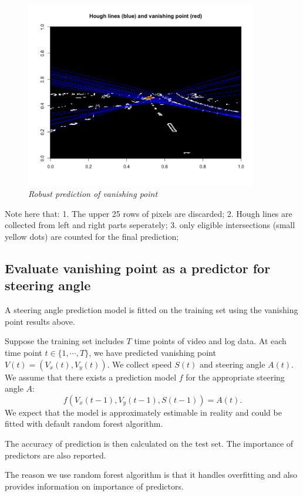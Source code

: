 \documentclass[11pt, oneside]{article}
\begin{document}
\begin{figure}[!ht]
  \centering
      \includegraphics[width=0.9\textwidth]{Rplot2.png} 
  \caption{\textit{Robust prediction of vanishing point}}
\end{figure}

Note here that: 1. The upper 25 rows of pixels are discarded; 2. Hough lines are collected from left and right parts seperately; 3. only eligible intersections (small yellow dots) are counted for the final prediction;


\subsection*{Evaluate vanishing point as a predictor for steering angle}

A steering angle prediction model is fitted on the training set using the vanishing point results above. 

Suppose the training set includes $T$ time points of video and log data. At each time point $t \in \{1, \cdots, T\}$, we have predicted vanishing point $V(t) = (V_x(t), V_y(t))$. We collect speed $S(t)$ and steering angle $A(t)$. We assume that there exists a prediction model $f$ for the appropriate steering angle $A$:
$$
f(V_x(t-1), V_y(t-1), S(t-1)) = A(t).
$$
We expect that the model is approximately estimable in reality and could be fitted with default random forest algorithm. 

The accuracy of prediction is then calculated on the test set. The importance of predictors are also reported. 

The reason we use random forest algorithm is that it handles overfitting and also provides information on importance of predictors. 
\end{document}
